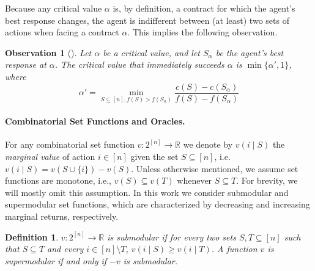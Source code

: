 \documentclass[11pt]{article}
\newtheorem{observation}{Observation}
\newtheorem{definition}{Definition}
\newcommand{\reals}{\mathbb{R}}
\begin{document}
Because any critical value $\alpha$ is, by definition, a contract for which the agent's best response changes, the agent is indifferent between (at least) two sets of actions when facing a contract $\alpha$. 
This implies the following observation.
\begin{observation}[\cite{dutting2022combinatorial}]\label{obs:critValStructure}
Let $\alpha$ be a critical value, and
let $S_\alpha$ be the agent's best response at $\alpha$.
The critical value that immediately succeeds $\alpha$ is $\min\{\alpha', 1\}$, where
$$
\alpha' = \min_{S \subseteq [n], f(S) > f(S_\alpha)} \frac{c(S) - c(S_\alpha)}{f(S) - f(S_\alpha)}
$$
\end{observation}

\paragraph{Combinatorial Set Functions and Oracles.}
For any combinatorial set function $v:2^{[n]} \to \reals$ we denote by $v(i \mid S)$ the \emph{marginal value} of action $i \in [n]$ given the set $S \subseteq [n]$, i.e. $v(i \mid S) = v(S \cup \{i\}) - v(S)$. Unless otherwise mentioned, we assume set functions are monotone, i.e., $v(S) \subseteq v(T)$ whenever $S \subseteq T$. For brevity, we will mostly omit this assumption.
In this work we consider submodular and supermodular set functions, which are characterized by decreasing and increasing marginal returns, respectively.
\begin{definition}\label{def:submodularity}
    $v:2^{[n]} \to \reals$ is \emph{submodular} if for every two sets $S,T \subseteq [n]$ such that $S\subseteq T$ and every $i \in [n] \setminus T$, $v(i \mid S)\ge v(i \mid T)$.
    A function $v$ is \emph{supermodular} if and only if $-v$ is submodular.
\end{definition}
\end{document}
